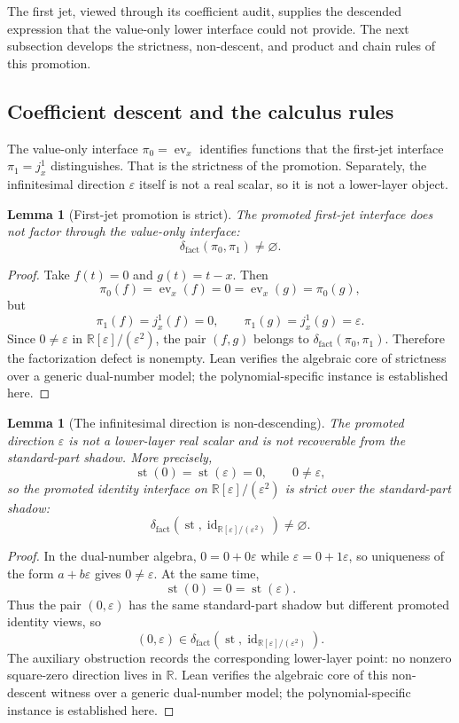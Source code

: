 \documentclass[11pt]{article}
\newcommand{\R}{\mathbb R}
\newcommand{\Dual}{\R[\varepsilon]/(\varepsilon^2)}
\newcommand{\id}{\operatorname{id}}
\newcommand{\ev}{\operatorname{ev}}
\newcommand{\st}{\operatorname{st}}
\newtheorem{lemma}[theorem]{Lemma}
\theoremstyle{definition}
\begin{document}
The first jet, viewed through its coefficient audit, supplies the descended
expression that the value-only lower interface could not provide.  The next
subsection develops the strictness, non-descent, and product and chain rules of
this promotion.

\subsection{Coefficient descent and the calculus rules}
\label{subsec:jet-coefficient-descent-rules}

The value-only interface \(\pi_0=\ev_x\) identifies functions that the first-jet
interface \(\pi_1=j_x^1\) distinguishes.  That is the strictness of the
promotion.  Separately, the infinitesimal direction \(\varepsilon\) itself is
not a real scalar, so it is not a lower-layer object.

\begin{lemma}[First-jet promotion is strict]
\label{lem:jet-promotion-strict}
The promoted first-jet interface does not factor through the value-only interface:
\[
\delta_{\mathrm{fact}}(\pi_0,\pi_1)\neq\varnothing.
\]
\end{lemma}

\begin{proof}
Take \(f(t)=0\) and \(g(t)=t-x\).  Then
\[
\pi_0(f)=\ev_x(f)=0=\ev_x(g)=\pi_0(g),
\]
but
\[
\pi_1(f)=j_x^1(f)=0,
\qquad
\pi_1(g)=j_x^1(g)=\varepsilon.
\]
Since \(0\neq\varepsilon\) in \(\Dual\), the pair \((f,g)\) belongs to
\(\delta_{\mathrm{fact}}(\pi_0,\pi_1)\).  Therefore the factorization defect is
nonempty.  Lean verifies the algebraic core of strictness over a generic
dual-number model; the polynomial-specific instance is established here.
\end{proof}

\begin{lemma}[The infinitesimal direction is non-descending]
\label{lem:jet-epsilon-nondescending}
The promoted direction \(\varepsilon\) is not a lower-layer real scalar and is not recoverable from the standard-part shadow.  More precisely,
\[
\st(0)=\st(\varepsilon)=0,
\qquad
0\neq\varepsilon,
\]
so the promoted identity interface on \(\Dual\) is strict over the standard-part shadow:
\[
\delta_{\mathrm{fact}}(\st,\id_{\Dual})\neq\varnothing.
\]
\end{lemma}

\begin{proof}
In the dual-number algebra, \(0=0+0\varepsilon\) while
\(\varepsilon=0+1\varepsilon\), so uniqueness of the form
\(a+b\varepsilon\) gives \(0\neq\varepsilon\).  At the same time,
\[
\st(0)=0=\st(\varepsilon).
\]
Thus the pair \((0,\varepsilon)\) has the same standard-part shadow but
different promoted identity views, so
\[
(0,\varepsilon)\in\delta_{\mathrm{fact}}(\st,\id_{\Dual}).
\]
The auxiliary obstruction  records the
corresponding lower-layer point: no nonzero square-zero direction lives in
\(\R\).  Lean verifies the algebraic core of this non-descent witness over a
generic dual-number model; the polynomial-specific instance is established
here.
\end{proof}
\end{document}
